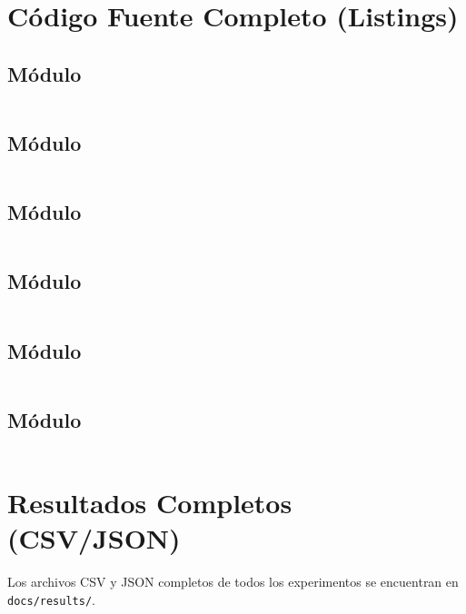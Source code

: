 
\chapter{Código Fuente Completo (Listings)}
\label{ap:codigo}
\section{Módulo }
\inputminted{python}{../src/tactical_grid/domain/rules.py}

\section{Módulo }
\inputminted{python}{../src/tactical_grid/algorithms/informed.py}

\section{Módulo }
\inputminted{python}{../src/tactical_grid/algorithms/adversarial.py}

\section{Módulo }
\inputminted{python}{../src/tactical_grid/algorithms/utility.py}

\section{Módulo }
\inputminted{python}{../src/tactical_grid/scenario/loader.py}

\section{Módulo }
\inputminted{python}{../src/tactical_grid/experiments/verifier.py}

\chapter{Resultados Completos (CSV/JSON)}
\label{ap:resultados}
Los archivos CSV y JSON completos de todos los experimentos se encuentran en \texttt{docs/results/}.

